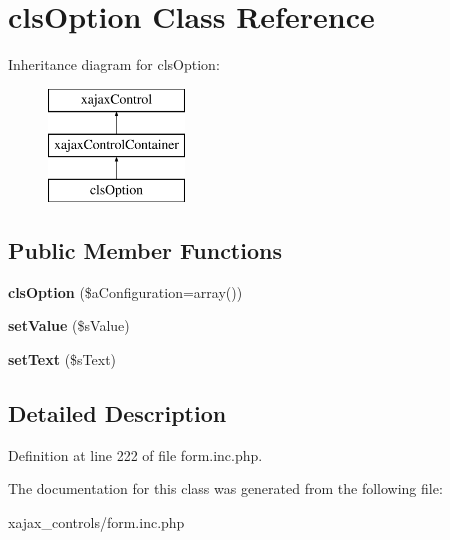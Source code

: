 \hypertarget{classclsOption}{
\section{clsOption Class Reference}
\label{classclsOption}
}
Inheritance diagram for clsOption:\begin{figure}[H]
\begin{center}
\leavevmode
\includegraphics[height=3.000000cm]{classclsOption}
\end{center}
\end{figure}
\subsection*{Public Member Functions}
\begin{DoxyCompactItemize}
\item 
\hypertarget{classclsOption_a64135332fe9010b582c4006099ee73a0}{
{\bfseries clsOption} (\$aConfiguration=array())}
\label{classclsOption_a64135332fe9010b582c4006099ee73a0}

\item 
\hypertarget{classclsOption_a313a9f6e423c66966f41305238803828}{
{\bfseries setValue} (\$sValue)}
\label{classclsOption_a313a9f6e423c66966f41305238803828}

\item 
\hypertarget{classclsOption_aef5713a971413b9fb362124853bc2b2c}{
{\bfseries setText} (\$sText)}
\label{classclsOption_aef5713a971413b9fb362124853bc2b2c}

\end{DoxyCompactItemize}


\subsection{Detailed Description}


Definition at line 222 of file form.inc.php.



The documentation for this class was generated from the following file:\begin{DoxyCompactItemize}
\item 
xajax\_\-controls/form.inc.php\end{DoxyCompactItemize}
